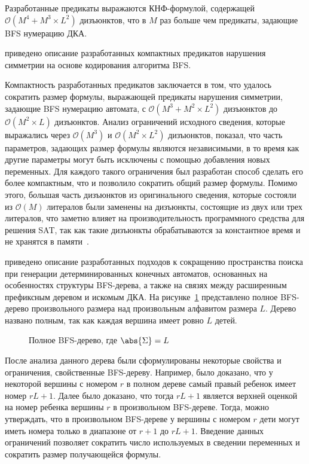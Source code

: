 Разработанные предикаты выражаются КНФ-формулой, содержащей $\mathcal{O}\left(M^{4} + M^{3} \times L^{2}\right)$ дизъюнктов, что в $M$ раз больше чем предикаты, задающие BFS нумерацию ДКА.

\insection{\ref{sec:space:tight}} приведено описание разработанных компактных предикатов нарушения симметрии на основе кодирования алгоритма BFS.

Компактность разработанных предикатов заключается в том, что удалось сократить размер формулы, выражающей предикаты нарушения симметрии, задающие BFS нумерацию автомата, с $\mathcal{O}\left(M^{3} + M^{2} \times L^{2}\right)$ дизъюнктов до $\mathcal{O}\left(M^{2} \times L\right)$ дизъюнктов.
Анализ ограничений исходного сведения, которые выражались через $\mathcal{O}\left(M^{3}\right)$ и $\mathcal{O}\left(M^{2} \times L^{2}\right)$ дизъюнктов, показал, что часть параметров, задающих размер формулы являются независимыми, в то время как другие параметры могут быть исключены с помощью добавления новых переменных. 
Для каждого такого ограничения был разработан способ сделать его более компактным, что и позволило сократить общий размер формулы.
Помимо этого, б\emph{о}льшая часть дизъюнктов из оригинального сведения, которые состояли из $\mathcal{O}\left(M\right)$ литералов
были заменены на дизъюнкты, состоящие из двух или трех литералов, что заметно влияет на производительность программного средства для решения SAT, так как такие дизъюнкты обрабатываются за константное время и не хранятся в памяти~\cite{MSilva-SATbook09}.

\insection{\ref{sec:space:pruning}} приведено описание разработанных подходов к сокращению пространства поиска при генерации детерминированных конечных автоматов, основанных на особенностях структуры BFS-дерева, а также на связях между расширенным префиксным деревом и искомым ДКА.
На рисунке~\ref{syn:img:full-bfs} представлено полное BFS-дерево произвольного размера над произвольным алфавитом размера $L$.
Дерево названо полным, так как каждая вершина имеет ровно $L$ детей.

\begin{figure}[ht]
  \centering
  \scalebox{0.625}{}
  \caption{Полное BFS-дерево, где $\abs{\Sigma}=L$}
  \label{syn:img:full-bfs}
\end{figure}

После анализа данного дерева были сформулированы некоторые свойства и ограничения, свойственные BFS-дереву.
Например, было доказано, что у некоторой вершины с номером $r$ в полном дереве самый правый ребенок имеет номер $rL + 1$.
Далее было доказано, что тогда $rL + 1$ является верхней оценкой на номер ребенка вершины $r$ в произвольном BFS-дереве.
Тогда, можно утверждать, что в произвольном BFS-дереве у вершины с номером $r$ дети могут иметь номера только в диапазоне от $r + 1$ до $rL + 1$.
Введение данных ограничений позволяет сократить число используемых в сведении переменных и сократить размер получающейся формулы.

